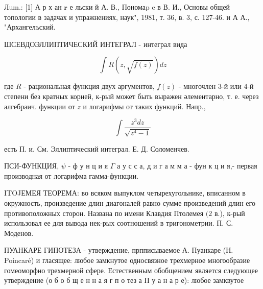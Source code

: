\documentclass[10pt]{article}
\begin{document}
Лum.: [1] А р х ан $\mathbf{r}$ е льски й А. В., Пономаp e в В. И., Основы общей топологии в задачах и упражнениях, наук", 1981, т. 36, в. 3, с. 127-46. и А А., "Архангелъский.



ШСЕВДОЭЛЛИПТИЧЕСКИЙ ИНТЕГРАЛ - интеграл вида



\[

\int R(z, \sqrt{f(z)}) d z

\]



где $R$ - рациональная функция двух аргументов, $f(z)$ - многочлен 3-й или 4-й степени без кратных корней, к-рый может быть выражен әлементарно, т. е. через алгебраич. функции от $z$ и логарифмы от таких функций. Напр.,



\[

\int \frac{z^{3} d z}{\sqrt{z^{4}-1}}

\]



есть П. и. См. Эллиптический интеграл. Е. Д. Соломенчев.



ПСИ-ФУНКЦИЯ, $\psi$ - ф у н ц и я $\Gamma$ а у с с а, д и г а м м а - фун к ц и я,- первая производная от логарифма гамма-функции.



ITOJЕМЕЯ ТЕОРЕМА: во всяком выпуклом четырехугольнике, вписанном в окружность, произведение длин диагоналей равно сумме произведений длин его противоположных сторон. Названа по имени Клавдия Птолемея $(2$ в.), к-рый использовал ее для вывода нек-рых соотношений в тригонометрии. П. С. Моденов.



ПУАНКАРЕ ГИПОТЕЗА - утверждение, прпписываемое А. Пуанкаре (Н. Poincaré) и гласящее: любое замкнутое односвязное трехмерное многообразие гомеоморфно трехмерной сфере. Естественным обобщением является следующее утверждение (о б о б щ е н н а я г п о тез а П у а н а р е): любое замквутое
\end{document}
